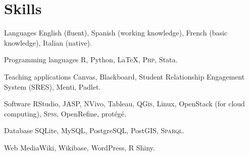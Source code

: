 \documentclass[12pt,a4paper,sans]{moderncv}
\begin{document}
\section{Skills}

  \cvline
    {Languages} %
    {English (fluent), Spanish (working knowledge), French (basic knowledge), Italian (native).} %

  \cvline
    {Programming languages} %
    {\textsc{R}, Python, LaTeX, \textsc{Php},  Stata.} 

  \cvline
    {Teaching applications} %
    {Canvas, Blackboard, Student Relationship Engagement System (SRES), Menti, Padlet.} 

  \cvline
    {Software} %
    {RStudio, JASP, NVivo, Tableau, \textsc{QGis}, Linux, OpenStack (for cloud computing), \textsc{Spss}, OpenRefine, protégé.} 

  \cvline
    {Database} %
    {SQLite, MySQL, PostgreSQL, PostGIS, \textsc{Sparql}.} %

  \cvline
    {Web} %
    {MediaWiki, Wikibase, WordPress, R Shiny.} %
\end{document}
